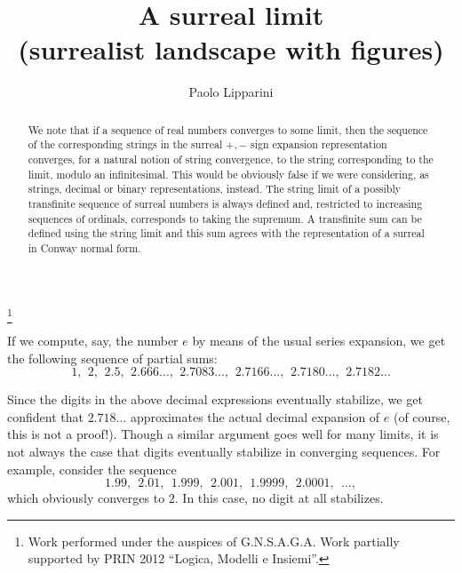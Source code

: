 \documentclass[12pt]{amsart}
\theoremstyle{definition}
\theoremstyle{remark}
\begin{document}
\title[A surreal limit]{A surreal limit \\ (surrealist landscape with figures)} 

\author{Paolo Lipparini} 
\address{Dipartimento di Matematica\\Viale della Ricerca Scientifica\\
Universit\`a di Roma ``Tor Virgolettata'' \\I-00133 ROME ITALY}



\thanks{Work performed under the auspices of G.N.S.A.G.A. Work partially supported by PRIN 2012 ``Logica, Modelli e Insiemi''.}

\begin{abstract}
We note that if a sequence of real 
numbers converges to some limit, then 
the sequence of the corresponding strings  in the   surreal 
$+,-$ sign expansion 
representation converges, for  a natural notion
of string convergence,
to the string corresponding to the  limit,
modulo an infinitesimal.
This would be obviously false if we
were considering, as strings,  decimal or binary representations, 
instead. The string limit 
of a possibly transfinite
sequence of surreal numbers is always defined and, restricted 
to increasing sequences of ordinals, corresponds to 
taking the supremum.
A transfinite sum can be defined 
using the string limit   
and this sum agrees with the
representation of a surreal in 
Conway normal form.
\end{abstract} 

\maketitle  

\bigskip 

If we compute, say, the number $e$ by means of the usual series expansion,
we get the following sequence of partial sums:
\[
1, \ \, 2, \ \, 2.5, \ \, 2.666\dots, \ \, 2.7083\dots, \ \,  2.7166\dots,  \ \,  2.7180\dots, \ \,  2.7182\dots
 \] 
 
Since the digits in the above decimal expressions eventually stabilize, we get 
confident that $2.718\dots$  approximates the actual decimal expansion of $e$
(of course, this is not a proof!).
Though a similar argument goes well for many limits,
it is not always the case that digits eventually stabilize
 in converging sequences. For example, consider the sequence
\[
1.99, \ \ 2.01, \ \ 1.999, \ \  2.001, \ \ 1.9999, \ \  2.0001, \ \  \dots, 
 \] 
 which obviously converges to $2$. In this case, no digit at all stabilizes.
\end{document}
